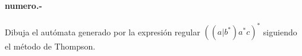 

\paragraph{{numero}.-}\label{p{numero}}
Dibuja el autómata generado por la expresión regular $ ((a|b^*)a^*c)^* $ siguiendo el método de Thompson.
    \myincludegraphicssol{}
